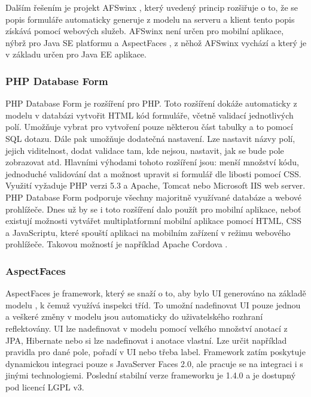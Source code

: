Dalším řešením je projekt AFSwinx \cite{tomasek-thesis}, který uvedený princip rozšiřuje o to, že se popis formuláře automaticky generuje z modelu na serveru a klient tento popis získává pomocí webových služeb. AFSwinx není určen pro mobilní aplikace, nýbrž pro Java SE platformu a AspectFaces \cite{aspect-faces}, z něhož AFSwinx vychází a který je v základu určen pro Java EE aplikace.

\subsubsection{PHP Database Form}
PHP Database Form \cite{phpdbform} je rozšíření pro PHP. Toto rozšíření dokáže automaticky z modelu v databázi vytvořit HTML kód formuláře, včetně validací jednotlivých polí. Umožňuje vybrat pro vytvoření pouze některou část tabulky a to pomocí SQL dotazu. Dále pak umožňuje dodatečná nastavení. Lze nastavit názvy polí, jejich viditelnost, dodat validace tam, kde nejsou, nastavit, jak se bude pole zobrazovat atd. Hlavními výhodami tohoto rozšíření jsou: menší množství kódu, jednoduché validování dat a možnost upravit si formulář dle libosti pomocí CSS. Využití vyžaduje PHP verzi 5.3 a Apache, Tomcat nebo Microsoft IIS web server. PHP Database Form podporuje všechny majoritně využívané databáze a webové prohlížeče. Dnes už by se i toto rozšíření dalo použít pro mobilní aplikace, neboť existují možnosti vytvářet multiplatformní mobilní aplikace pomocí HTML, CSS a JavaScriptu, které spouští aplikaci na mobilním zařízení v režimu webového prohlížeče. Takovou možností je například Apache Cordova \cite{apache-cordova}.

\subsubsection{AspectFaces}
AspectFaces je framework, který se snaží o to, aby bylo UI generováno na základě modelu \cite{aspectdriven}, k čemuž využívá inspekci tříd. To umožní nadefinovat UI pouze jednou a veškeré změny v modelu jsou automaticky do uživatelského rozhraní reflektovány. UI lze nadefinovat v modelu pomocí velkého množství anotací z JPA, Hibernate nebo si lze nadefinovat i anotace vlastní. Lze určit například pravidla pro dané pole, pořadí v UI nebo třeba label. Framework zatím poskytuje dynamickou integraci pouze s JavaServer Faces 2.0, ale pracuje se na integraci i s jinými technologiemi. Poslední stabilní verze frameworku je 1.4.0 a je dostupný pod licencí LGPL v3.

